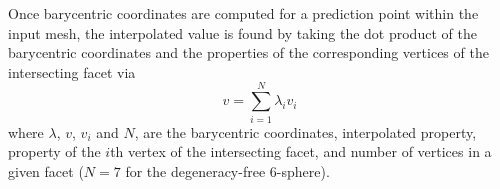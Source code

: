 \documentclass[preprint,12pt]{elsarticle}
\begin{document}
Once barycentric coordinates are computed for a prediction point within the input mesh, the interpolated value is found by taking the dot product of the barycentric coordinates and the properties of the corresponding vertices of the intersecting facet via
\begin{equation}
v=\underset{i=1}{\overset{N}{\sum }}\lambda _i v_i
\end{equation}
where $\lambda$, $v$, $v_i$ and $N$, are the barycentric coordinates, interpolated property, property of the $i$th vertex of the intersecting facet, and number of vertices in a given facet ($N = 7$ for the degeneracy-free 6-sphere).
    


\end{document}
